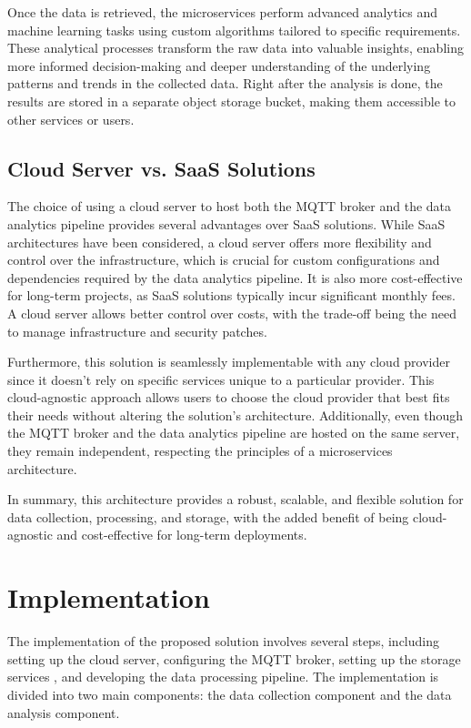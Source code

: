 Once the data is retrieved, the microservices perform advanced analytics and machine learning tasks using custom algorithms tailored to specific requirements. These analytical processes transform the raw data into valuable insights, enabling more informed decision-making and deeper understanding of the underlying patterns and trends in the collected data.
Right after the analysis is done, the results are stored in a separate object storage bucket, making them accessible to other services or users.

\subsection{Cloud Server vs. SaaS Solutions}

The choice of using a cloud server to host both the MQTT broker and the data analytics pipeline provides several advantages over SaaS solutions. While SaaS architectures have been considered, a cloud server offers more flexibility and control over the infrastructure, which is crucial for custom configurations and dependencies required by the data analytics pipeline. It is also more cost-effective for long-term projects, as SaaS solutions typically incur significant monthly fees. A cloud server allows better control over costs, with the trade-off being the need to manage infrastructure and security patches.

Furthermore, this solution is seamlessly implementable with any cloud provider since it doesn't rely on specific services unique to a particular provider. This cloud-agnostic approach allows users to choose the cloud provider that best fits their needs without altering the solution's architecture. Additionally, even though the MQTT broker and the data analytics pipeline are hosted on the same server, they remain independent, respecting the principles of a microservices architecture.

In summary, this architecture provides a robust, scalable, and flexible solution for data collection, processing, and storage, with the added benefit of being cloud-agnostic and cost-effective for long-term deployments.

\section{Implementation}

The implementation of the proposed solution involves several steps, including setting up the cloud server, configuring the MQTT broker, setting up the storage services , and developing the data processing pipeline. The implementation is divided into two main components: the data collection component and the data analysis component.

